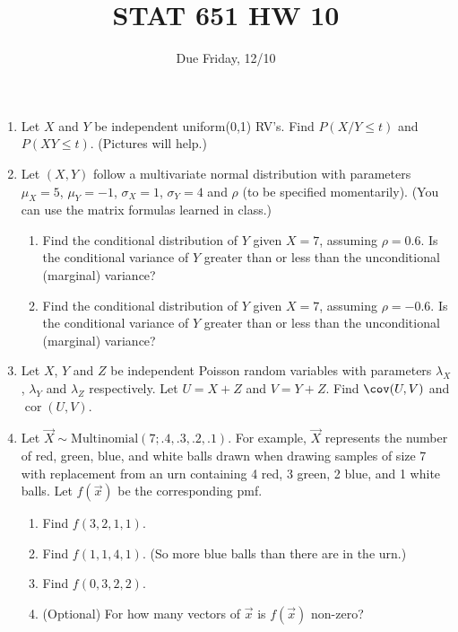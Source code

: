 \documentclass[12pt]{article}
\begin{document}
\title{STAT 651 HW 10}
\author{Due Friday, 12/10}
\date{}
\maketitle


\begin{enumerate}
\item Let $X$ and $Y$ be independent uniform(0,1) RV's. Find
$P(X/Y\le t)$ and $P(XY\le t)$. (Pictures will help.)

\item Let $(X,Y)$ follow a multivariate normal distribution with parameters
$\mu_X = 5$, $\mu_Y = -1$, $\sigma_X = 1$, $\sigma_Y=4$ and $\rho$ (to be specified momentarily).
(You can use the matrix formulas learned in class.)

  \begin{enumerate}
  \item Find the conditional distribution of $Y$ given $X=7$, assuming $\rho = 0.6$.
  Is the conditional variance of $Y$ greater than or less than the unconditional (marginal) variance?
  \item Find the conditional distribution of $Y$ given $X=7$, assuming $\rho = -0.6$.
  Is the conditional variance of $Y$ greater than or less than the unconditional (marginal) variance?
  \end{enumerate}

\item Let $X$, $Y$ and $Z$ be independent Poisson random variables with parameters
$\lambda_X$, $\lambda_Y$ and $\lambda_Z$ respectively. Let $U = X+Z$ and $V = Y+Z$.
Find $\cov(U,V)$ and $\operatorname{cor}(U,V)$.

\item Let $\vec{X} \sim \text{Multinomial}(7; .4,.3,.2,.1)$.  For
example, $\vec{X}$ represents
the number of red, green, blue, and white balls drawn when drawing samples of size 7
with replacement from an urn containing
4 red, 3 green, 2 blue, and 1 white balls.  Let $f(\vec{x})$ be the corresponding pmf.
  \begin{enumerate}
  \item Find $f(3,2,1,1)$.
  \item Find $f(1,1,4,1)$. (So more blue balls than there are in the urn.)
  \item Find $f(0,3,2,2)$.
  \item (Optional) For how many vectors of $\vec{x}$ is $f(\vec{x})$ non-zero?
  \end{enumerate}


\end{enumerate}
\end{document}
